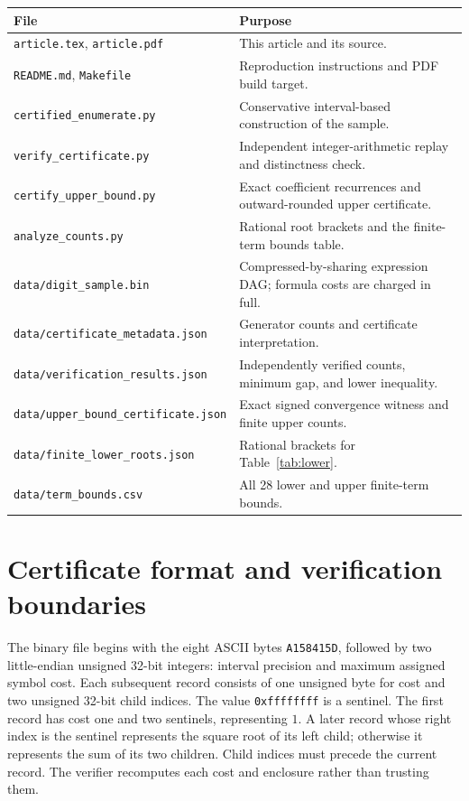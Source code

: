 \documentclass[11pt,letterpaper]{article}
\numberwithin{equation}{section}
\theoremstyle{definition}
\begin{document}
{\small
\begin{longtable}{@{}p{}p{}@{}}
\toprule
File & Purpose\\
\midrule
\endhead
\texttt{article.tex}, \texttt{article.pdf} & This article and its source.\\
\texttt{README.md}, \texttt{Makefile} & Reproduction instructions and PDF build target.\\
\texttt{certified\_enumerate.py} & Conservative interval-based construction of the sample.\\
\texttt{verify\_certificate.py} & Independent integer-arithmetic replay and distinctness check.\\
\texttt{certify\_upper\_bound.py} & Exact coefficient recurrences and outward-rounded upper certificate.\\
\texttt{analyze\_counts.py} & Rational root brackets and the finite-term bounds table.\\
\texttt{data/digit\_sample.bin} & Compressed-by-sharing expression DAG; formula costs are charged in full.\\
\texttt{data/certificate\_metadata.json} & Generator counts and certificate interpretation.\\
\texttt{data/verification\_results.json} & Independently verified counts, minimum gap, and lower inequality.\\
\texttt{data/upper\_bound\_certificate.json} & Exact signed convergence witness and finite upper counts.\\
\texttt{data/finite\_lower\_roots.json} & Rational brackets for Table~\ref{tab:lower}.\\
\texttt{data/term\_bounds.csv} & All 28 lower and upper finite-term bounds.\\
\bottomrule
\end{longtable}
}

\section{Certificate format and verification boundaries}

The binary file begins with the eight ASCII bytes \texttt{A158415D}, followed
by two little-endian unsigned 32-bit integers: interval precision and maximum
assigned symbol cost. Each subsequent record consists of one unsigned byte
for cost and two unsigned 32-bit child indices.
The value \texttt{0xffffffff} is a sentinel. The first record has cost one
and two sentinels, representing $1$. A later record whose right index is the
sentinel represents the square root of its left child; otherwise it represents
the sum of its two children. Child indices must precede the current record.
The verifier recomputes each cost and enclosure rather than trusting them.
\end{document}
